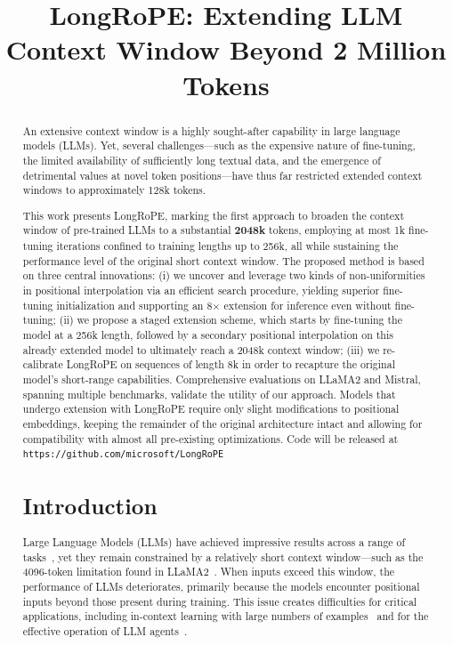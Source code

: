 \title{LongRoPE: Extending LLM Context Window Beyond 2 Million Tokens}

\begin{abstract}
An extensive context window is a highly sought-after capability in large language models (LLMs). Yet, several challenges—such as the expensive nature of fine-tuning, the limited availability of sufficiently long textual data, and the emergence of detrimental values at novel token positions—have thus far restricted extended context windows to approximately 128k tokens.

This work presents LongRoPE, marking the first approach to broaden the context window of pre-trained LLMs to a substantial \textbf{2048k} tokens, employing at most 1k fine-tuning iterations confined to training lengths up to 256k, all while sustaining the performance level of the original short context window. The proposed method is based on three central innovations: (i) we uncover and leverage two kinds of non-uniformities in positional interpolation via an efficient search procedure, yielding superior fine-tuning initialization and supporting an 8$\times$ extension for inference even without fine-tuning; (ii) we propose a staged extension scheme, which starts by fine-tuning the model at a 256k length, followed by a secondary positional interpolation on this already extended model to ultimately reach a 2048k context window; (iii) we re-calibrate LongRoPE on sequences of length 8k in order to recapture the original model’s short-range capabilities. Comprehensive evaluations on LLaMA2 and Mistral, spanning multiple benchmarks, validate the utility of our approach. Models that undergo extension with LongRoPE require only slight modifications to positional embeddings, keeping the remainder of the original architecture intact and allowing for compatibility with almost all pre-existing optimizations. Code will be released at \texttt{https://github.com/microsoft/LongRoPE}

\section{Introduction}

Large Language Models (LLMs) have achieved impressive results across a range of tasks~\cite{gpt4,llama2}, yet they remain constrained by a relatively short context window—such as the 4096-token limitation found in LLaMA2~\cite{llama2}. When inputs exceed this window, the performance of LLMs deteriorates, primarily because the models encounter positional inputs beyond those present during training. This issue creates difficulties for critical applications, including in-context learning with large numbers of examples~\cite{Huang2023FewerIM} and for the effective operation of LLM agents~\cite{park2023generative,madaan2023selfrefine}.


\end{abstract}
